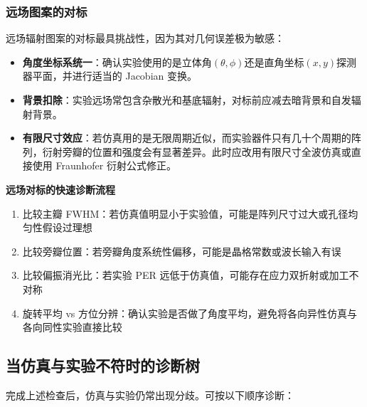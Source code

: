 \subsubsection{远场图案的对标}
远场辐射图案的对标最具挑战性，因为其对几何误差极为敏感：

\begin{itemize}
  \item \textbf{角度坐标系统一}：确认实验使用的是立体角$(\theta,\phi)$还是直角坐标$(x,y)$探测器平面，并进行适当的 Jacobian 变换。
  
  \item \textbf{背景扣除}：实验远场常包含杂散光和基底辐射，对标前应减去暗背景和自发辐射背景。
  
  \item \textbf{有限尺寸效应}：若仿真用的是无限周期近似，而实验器件只有几十个周期的阵列，衍射旁瓣的位置和强度会有显著差异。此时应改用有限尺寸全波仿真或直接使用 Fraunhofer 衍射公式修正。
\end{itemize}

\begin{CrossValidationBox}
\textbf{远场对标的快速诊断流程}
\begin{enumerate}
  \item 比较主瓣 FWHM：若仿真值明显小于实验值，可能是阵列尺寸过大或孔径均匀性假设过理想
  \item 比较旁瓣位置：若旁瓣角度系统性偏移，可能是晶格常数或波长输入有误
  \item 比较偏振消光比：若实验 PER 远低于仿真值，可能存在应力双折射或加工不对称
  \item 旋转平均 vs 方位分辨：确认实验是否做了角度平均，避免将各向异性仿真与各向同性实验直接比较
\end{enumerate}
\end{CrossValidationBox}

\subsection{当仿真与实验不符时的诊断树}
完成上述检查后，仿真与实验仍常出现分歧。可按以下顺序诊断：

